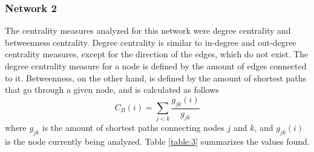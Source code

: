 \subsubsection{Network 2}
The centrality measures analyzed for this network were degree centrality and betweenness centrality. Degree centrality is similar to in-degree and out-degree centrality measures, except for the direction of the edges, which do not exist. The degree centrality measure for a node is defined by the amount of edges connected to it. Betweenness, on the other hand, is defined by the amount of shortest paths that go through a given node, and is calculated as follows
\begin{equation}
    C_B(i) = \sum_{j<k}\frac{g_{jk}(i)}{g_{jk}}
    \label{equation:betweenness_centrality}
\end{equation}
where $g_{jk}$ is the amount of shortest paths connecting nodes $j$ and $k$, and $g_{jk}(i)$ is the node currently being analyzed. Table \ref{table:3} summarizes the values found.
\begin{table}
    \centering
    \qquad
    \caption{Network 2 centrality}
    \label{table:3}
\end{table}

